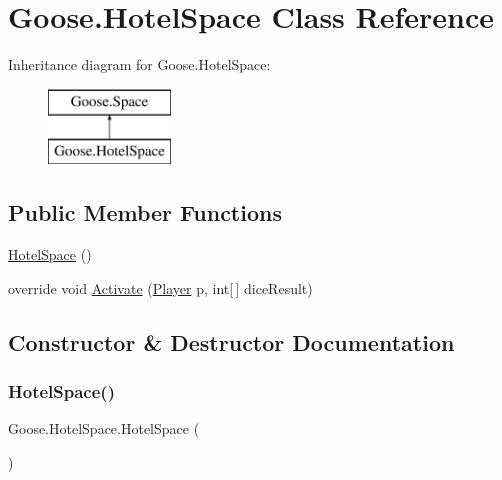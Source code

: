 \hypertarget{class_goose_1_1_hotel_space}{}\section{Goose.\+Hotel\+Space Class Reference}
\label{class_goose_1_1_hotel_space}
Inheritance diagram for Goose.\+Hotel\+Space\+:\begin{figure}[H]
\begin{center}
\leavevmode
\includegraphics[height=2.000000cm]{class_goose_1_1_hotel_space}
\end{center}
\end{figure}
\subsection*{Public Member Functions}
\begin{DoxyCompactItemize}
\item 
\hyperlink{class_goose_1_1_hotel_space_a5434ad9eba347f40f8d136c2612fe15e}{Hotel\+Space} ()
\item 
override void \hyperlink{class_goose_1_1_hotel_space_a5db408cc238e50b4a592b557b043d3ee}{Activate} (\hyperlink{class_goose_1_1_player}{Player} p, int\mbox{[}$\,$\mbox{]} dice\+Result)
\end{DoxyCompactItemize}


\subsection{Constructor \& Destructor Documentation}
\mbox{\label{class_goose_1_1_hotel_space_a5434ad9eba347f40f8d136c2612fe15e}} 
\subsubsection{\texorpdfstring{Hotel\+Space()}{HotelSpace()}}
{\footnotesize\ttfamily Goose.\+Hotel\+Space.\+Hotel\+Space (\begin{DoxyParamCaption}{ }\end{DoxyParamCaption})}



